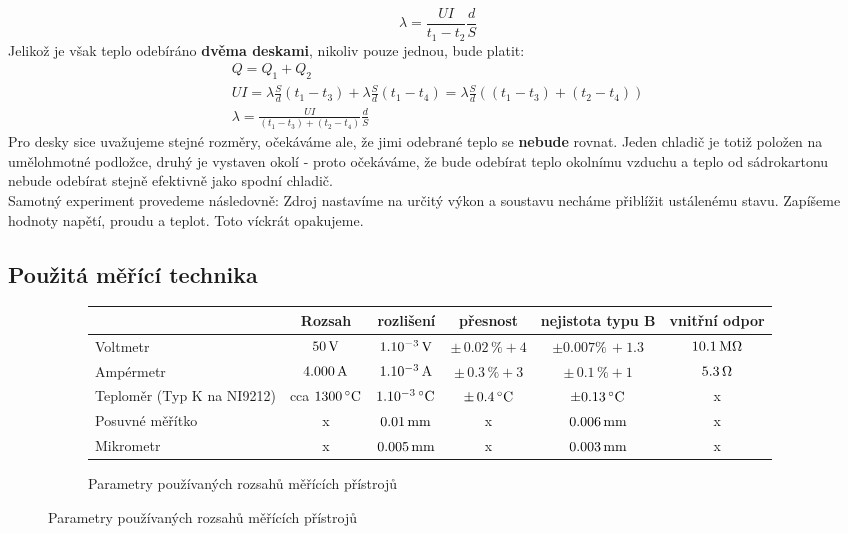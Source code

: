 \documentclass[czech,11pt,a4paper]{article}
\begin{document}
\begin{equation}
	\lambda = \frac{UI}{t_1 - t_2} \frac d S
\end{equation}
Jelikož je však teplo odebíráno \textbf{dvěma deskami}, nikoliv pouze jednou, bude platit:
\begin{gather}
	Q = Q_1 + Q_2\\
	UI = \lambda \frac{S}{d} (t_1 - t_3) + \lambda  \frac{S}{d} (t_1 - t_4) = \lambda \frac{S}d \left( (t_1 - t_3) + (t_2 - t_4)\right)\\
	\lambda = \frac{UI}{(t_1 - t_3) + (t_2 - t_4)} \frac d S
\end{gather}
Pro desky sice uvažujeme stejné rozměry, očekáváme ale, že jimi odebrané teplo se \textbf{nebude} rovnat. Jeden chladič je totiž položen na umělohmotné podložce, druhý je vystaven okolí - proto očekáváme, že bude odebírat teplo okolnímu vzduchu a teplo od sádrokartonu nebude odebírat stejně efektivně jako spodní chladič.\\
Samotný experiment provedeme následovně: Zdroj nastavíme na určitý výkon a soustavu necháme přiblížit ustálenému stavu. Zapíšeme hodnoty napětí, proudu a teplot. Toto víckrát opakujeme.

\subsection{Použitá měřící technika}
	\begin{figure} [h]
		\begin{subfigure}{1\textwidth}
			\begin{center}
				
			\begin{tabular}{||l|c|c|c|c|c||}
				\hline
				& Rozsah & rozlišení & přesnost & nejistota typu B & vnitřní odpor\\
				\hline
				{Voltmetr} &$50 \,\rm V $& $1 . 10^{-3} \,\rm V$  & $\pm \, 0.02\, \%   +4$ &$\pm 0. 007\% \, + 1.3$&$10.1 \,\rm M \Omega$ \\
				\hline
				{Ampérmetr} &$4.000 \,\rm A $& $1 . 10^{-3} \,\rm A$  & $\pm \, 0.3\, \%   +3$ &$ \pm \, 0.1\, \%   +1$  &$5.3 \,\rm  \Omega$ \\
				\hline
				Teploměr (Typ K na NI9212) &cca $ 1300 \,\rm ^\circ C $& $1 . 10^{-3} \,\rm ^\circ C$ &$\pm \, 0.4 \,\rm ^\circ C$ & $\pm 0.13 \, \rm ^\circ C$& x\\ \hline
				Posuvné měřítko &x & $0.01 \,\rm mm$  & x & $0.006 \,\rm mm$ &x \\ \hline
				Mikrometr &x & $0.005 \,\rm mm$  & x & $0.003 \,\rm mm$ &x \\ \hline
				
			\end{tabular}
			\end{center}
			
			\caption*{Parametry používaných rozsahů měřících přístrojů}
		\end{subfigure}
	\end{figure}
	\newpage
	
\end{document}
